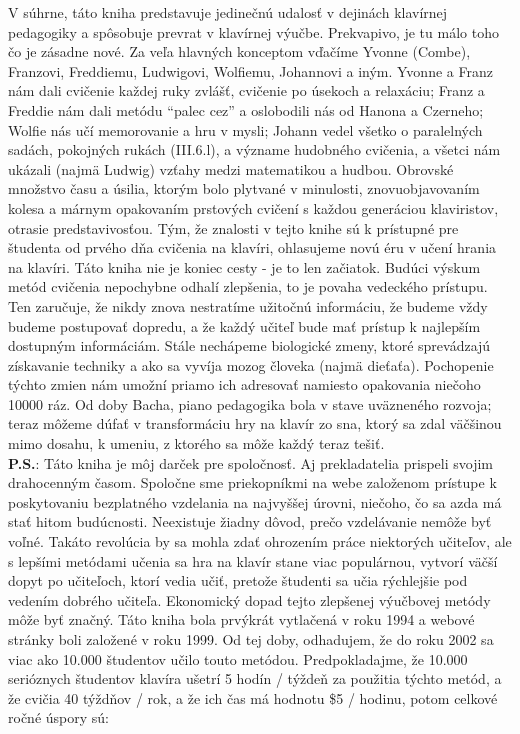 V súhrne, táto kniha predstavuje jedinečnú udalosť v dejinách klavírnej pedagogiky a spôsobuje prevrat v klavírnej výučbe. Prekvapivo, je tu málo toho čo je zásadne nové. Za veľa hlavných konceptom vďačíme Yvonne (Combe), Franzovi, Freddiemu, Ludwigovi, Wolfiemu, Johannovi a iným. Yvonne a Franz nám dali cvičenie každej ruky zvlášť, cvičenie po úsekoch a relaxáciu; Franz a Freddie nám dali metódu “palec cez” a oslobodili nás od Hanona a Czerneho; Wolfie nás učí memorovanie a hru v mysli; Johann vedel všetko o paralelných sadách, pokojných rukách (III.6.l), a význame hudobného cvičenia, a všetci nám ukázali (najmä Ludwig) vzťahy medzi matematikou a hudbou. Obrovské množstvo času a úsilia, ktorým bolo plytvané v minulosti, znovuobjavovaním kolesa a márnym opakovaním prstových cvičení s každou generáciou klaviristov, otrasie predstavivosťou. Tým, že znalosti v tejto knihe sú k prístupné pre študenta od prvého dňa cvičenia na klavíri, ohlasujeme novú éru v učení hrania na klavíri. Táto kniha nie je koniec cesty - je to len začiatok. Budúci výskum metód cvičenia nepochybne odhalí zlepšenia, to je povaha vedeckého prístupu. Ten zaručuje, že nikdy znova nestratíme užitočnú informáciu, že budeme vždy budeme postupovať dopredu, a že každý učiteľ bude mať prístup k najlepším dostupným informáciám. Stále nechápeme biologické zmeny, ktoré sprevádzajú získavanie techniky a ako sa vyvíja mozog človeka (najmä dieťaťa). Pochopenie týchto zmien nám umožní priamo ich adresovať namiesto opakovania niečoho 10000 ráz. Od doby Bacha, piano pedagogika bola v stave uväzneného rozvoja; teraz môžeme dúfať v transformáciu hry na klavír zo sna, ktorý sa zdal väčšinou mimo dosahu, k umeniu, z ktorého sa môže každý teraz tešiť.
\vspace*{2cm}\\
\textbf{P.S.}: Táto kniha je môj darček pre spoločnosť. Aj prekladatelia prispeli svojim drahocenným časom. Spoločne sme priekopníkmi na webe založenom prístupe k poskytovaniu bezplatného vzdelania na najvyššej úrovni, niečoho, čo sa azda má stať hitom budúcnosti. Neexistuje žiadny dôvod, prečo vzdelávanie nemôže byť voľné. Takáto revolúcia by sa mohla zdať ohrozením práce niektorých učiteľov,  ale s lepšími metódami učenia sa hra na klavír stane viac populárnou, vytvorí väčší dopyt po učiteľoch, ktorí vedia učiť, pretože študenti sa učia rýchlejšie pod vedením dobrého učiteľa. Ekonomický dopad tejto zlepšenej výučbovej metódy môže byť značný. Táto kniha bola prvýkrát vytlačená v roku 1994 a webové stránky boli založené v roku 1999. Od tej doby, odhadujem, že do roku 2002 sa viac ako 10.000 študentov učilo touto metódou. Predpokladajme, že 10.000 serióznych študentov klavíra ušetrí 5 hodín / týždeň za použitia týchto metód, a že cvičia 40 týždňov / rok, a že ich čas má hodnotu \$5 / hodinu, potom celkové ročné úspory sú:

